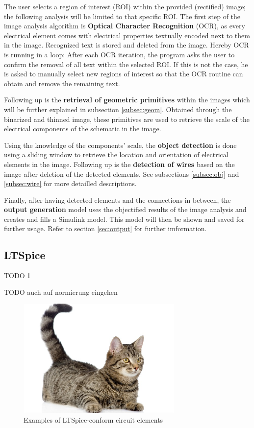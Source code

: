 \documentclass[10pt,twocolumn,letterpaper]{article}
\begin{document}
\par
The user selects a region of interest (ROI) within the provided (rectified) image; the following analysis will be limited to that specific ROI. The first step of the image analysis algorithm is \textbf{Optical Character Recognition} (OCR), as every electrical element comes with electrical properties textually encoded next to them in the image. Recognized text is stored and deleted from the image. Hereby OCR is running in a loop: After each OCR iteration, the program asks the user to confirm the removal of all text within the selected ROI. If this is not the case, he is asked to manually select new regions of interest so that the OCR routine can obtain and remove the remaining text.
\par
Following up is the \textbf{retrieval of geometric primitives} within the images which will be further explained in subsection \ref{subsec:geom}. Obtained through the binarized and thinned image, these primitives are used to retrieve the scale of the electrical components of the schematic in the image.
\par
Using the knowledge of the components' scale, the \textbf{object detection} is done using a sliding window to retrieve the location and orientation of electrical elements in the image. Following up is the \textbf{detection of wires} based on the image after deletion of the detected elements. See subsections \ref{subsec:obj} and \ref{subsec:wire} for more detailled descriptions.
\par
Finally, after having detected elements and the connections in between, the \textbf{output generation} model uses the objectified results of the image analysis and creates and fills a Simulink model. This model will then be shown and saved for further usage. Refer to section \ref{sec:output} for further imformation.

\subsection{LTSpice}
\label{subsec:spice}

TODO 1
\par
TODO auch auf normierung eingehen
\par

\begin{figure}[!ht]
\includegraphics[width = 3.2in]{img/cat.jpg}
\caption{Examples of LTSpice-conform circuit elements}
\label{fig:c4}
\end{figure}
\par
\end{document}
